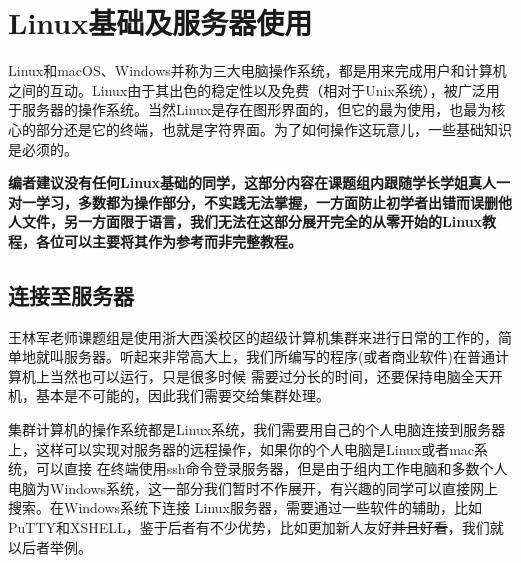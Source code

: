\documentclass{article}
\numberwithin{equation}{section}
\begin{document}
    \section{Linux基础及服务器使用}
    Linux和macOS、Windows并称为三大电脑操作系统，都是用来完成用户和计算机之间的互动。Linux由于其出色的稳定性以及免费（相对于Unix系统），被广泛用于服务器的操作系统。当然Linux是存在图形界面的，但它的最为使用，也最为核心的部分还是它的终端，也就是字符界面。为了如何操作这玩意儿，一些基础知识是必须的。

    {\color{red}\textbf{编者建议没有任何Linux基础的同学，这部分内容在课题组内跟随学长学姐真人一对一学习，多数都为操作部分，不实践无法掌握，一方面防止初学者出错而误删他人文件，另一方面限于语言，我们无法在这部分展开完全的从零开始的Linux教程，各位可以主要将其作为参考而非完整教程。}}

    \subsection{连接至服务器}
    王林军老师课题组是使用浙大西溪校区的超级计算机集群来进行日常的工作的，简单地就叫服务器。听起来非常高大上，我们所编写的程序(或者商业软件)在普通计算机上当然也可以运行，只是很多时候
    需要过分长的时间，还要保持电脑全天开机，基本是不可能的，因此我们需要交给集群处理。

    集群计算机的操作系统都是Linux系统，我们需要用自己的个人电脑连接到服务器上，这样可以实现对服务器的远程操作，如果你的个人电脑是Linux或者mac系统，可以直接
    在终端使用ssh命令登录服务器，但是由于组内工作电脑和多数个人电脑为Windows系统，这一部分我们暂时不作展开，有兴趣的同学可以直接网上搜索。在Windows系统下连接
    Linux服务器，需要通过一些软件的辅助，比如PuTTY和XSHELL，鉴于后者有不少优势，比如更加新人友好\sout{并且好看}，我们就以后者举例。
\end{document}
